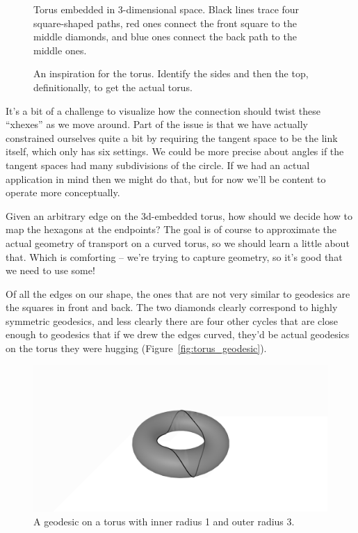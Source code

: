 \begin{figure}[h]
\centering

\caption{Torus embedded in 3-dimensional space. Black lines trace four square-shaped paths, red ones connect the front square to the middle diamonds, and blue ones connect the back path to the middle ones.}
\label{fig:torus}
\end{figure}

\begin{figure}[h]
\centering

\caption{An inspiration for the torus. Identify the sides and then the top, definitionally, to get the actual torus.}
\label{fig:flattorus}
\end{figure}

It's a bit of a challenge to visualize how the connection should twist these ``xhexes'' as we move around. Part of the issue is that we have actually constrained ourselves quite a bit by requiring the tangent space to be the link itself, which only has six settings. We could be more precise about angles if the tangent spaces had many subdivisions of the circle. If we had an actual application in mind then we might do that, but for now we'll be content to operate more conceptually.

Given an arbitrary edge on the 3d-embedded torus, how should we decide how to map the hexagons at the endpoints? The goal is of course to approximate the actual geometry of transport on a curved torus, so we should learn a little about that. Which is comforting -- we're trying to capture geometry, so it's good that we need to use some!

Of all the edges on our shape, the ones that are not very similar to geodesics are the squares in front and back. The two diamonds clearly correspond to highly symmetric geodesics, and less clearly there are four other cycles that are close enough to geodesics that if we drew the edges curved, they'd be actual geodesics on the torus they were hugging (Figure~\ref{fig:torus_geodesic}).


\begin{figure}[h]
\centering
\includegraphics[scale=.3]{torus_geodesic.png}
\caption{A geodesic on a torus with inner radius 1 and outer radius 3.}
\label{fig:torus_geodesic_smooth}
\end{figure}

